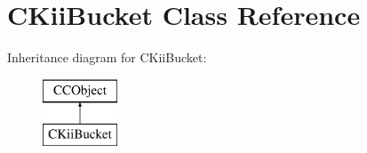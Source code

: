\hypertarget{class_c_kii_bucket}{\section{C\-Kii\-Bucket Class Reference}
\label{class_c_kii_bucket}
}
Inheritance diagram for C\-Kii\-Bucket\-:\begin{figure}[H]
\begin{center}
\leavevmode
\includegraphics[height=2.000000cm]{class_c_kii_bucket}
\end{center}
\end{figure}
